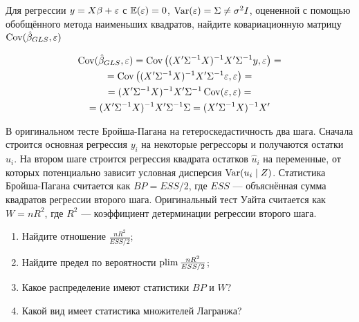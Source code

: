\begin{problem}
Для регрессии $y = X\beta + \varepsilon$ с $\operatorname{\mathbb E}(\varepsilon) = 0$, $\operatorname{Var}(\varepsilon) = \Sigma \neq \sigma^2 I$, оцененной с помощью обобщённого метода наименьших квадратов, найдите ковариационную матрицу $\operatorname{Cov}(\hat{\beta}_{GLS}, \varepsilon)$



\begin{sol}
\begin{multline*}
\operatorname{Cov}(\hat{\beta}_{GLS}, \varepsilon) = \operatorname{Cov} \left( (X' \Sigma^{-1} X)^{-1} X' \Sigma^{-1} y, \varepsilon \right) = \\
= \operatorname{Cov} \left( (X' \Sigma^{-1} X)^{-1} X' \Sigma^{-1} \varepsilon, \varepsilon \right) = \\
= (X' \Sigma^{-1} X)^{-1} X' \Sigma^{-1} \operatorname{Cov}(\varepsilon, \varepsilon) =\\
= (X' \Sigma^{-1} X)^{-1} X' \Sigma^{-1} \Sigma = (X' \Sigma^{-1} X)^{-1} X'
\end{multline*}
\end{sol}
\end{problem}


\begin{problem}
В оригинальном тесте Бройша-Пагана на гетероскедастичность два шага. Сначала строится основная регрессия $y_i$ на некоторые регрессоры и получаются остатки $\hat u_i$. На втором шаге строится регрессия квадрата остатков $\hat u_i$ на переменные, от которых потенциально зависит условная дисперсия $\operatorname{Var}(u_i \mid Z)$. Статистика Бройша-Пагана считается как $BP=ESS/2$, где $ESS$ — объяснённая сумма квадратов регрессии второго шага. Оригинальный тест Уайта считается как $W=nR^2$, где $R^2$ — коэффициент детерминации регрессии второго шага.
\begin{enumerate}
  \item Найдите отношение $\frac{nR^2}{ESS/2}$;
  \item Найдите предел по вероятности $\operatorname*{plim} \frac{nR^2}{ESS/2}$;
  \item Какое распределение имеют статистики $BP$ и $W$?
  \item Какой вид имеет статистика множителей Лагранжа?
\end{enumerate}


\begin{sol}

  \end{sol}
\end{problem}





